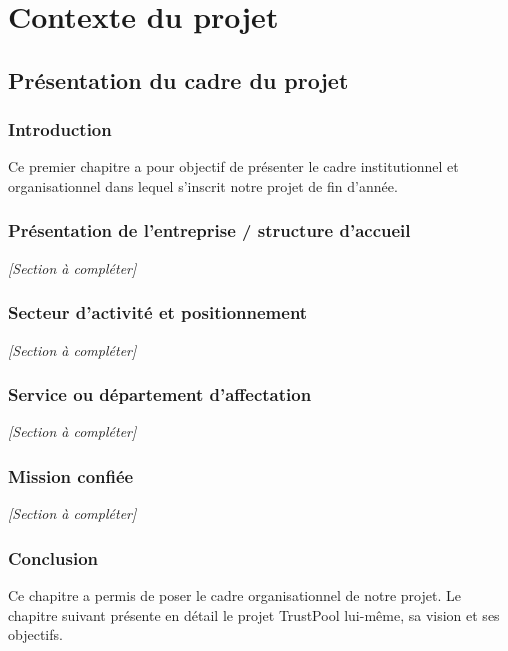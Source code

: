 \documentclass[12pt,a4paper]{report}
\begin{document}
\part{Contexte du projet}

\chapter{Présentation du cadre du projet}

\section{Introduction}
Ce premier chapitre a pour objectif de présenter le cadre institutionnel et organisationnel dans lequel s'inscrit notre projet de fin d'année.

\section{Présentation de l'entreprise / structure d'accueil}
\textit{[Section à compléter]}

\section{Secteur d'activité et positionnement}
\textit{[Section à compléter]}

\section{Service ou département d'affectation}
\textit{[Section à compléter]}

\section{Mission confiée}
\textit{[Section à compléter]}

\section{Conclusion}
Ce chapitre a permis de poser le cadre organisationnel de notre projet. Le chapitre suivant présente en détail le projet TrustPool lui-même, sa vision et ses objectifs.

\newpage

\end{document}
